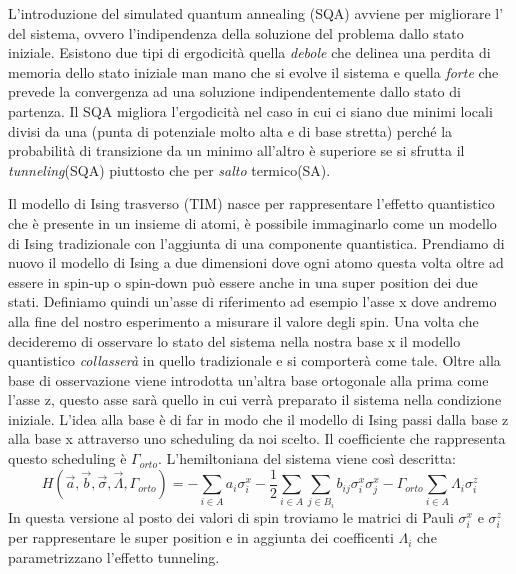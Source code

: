\cite{QA}L'introduzione del simulated quantum annealing (SQA) avviene per migliorare l' del sistema, ovvero l'indipendenza della soluzione del problema dallo stato iniziale. Esistono due tipi di ergodicità quella \textit{debole} che delinea una perdita di memoria dello stato iniziale man mano che si evolve il sistema e quella \textit{forte} che prevede la convergenza ad una soluzione indipendentemente dallo stato di partenza. Il SQA migliora l'ergodicità nel caso in cui ci siano due minimi locali divisi da una  (punta di potenziale molto alta e di base stretta) perché la probabilità di transizione da un minimo all'altro è superiore se si sfrutta il \textit{tunneling}(SQA) piuttosto che per \textit{salto} termico(SA).

\cite{QA}Il modello di Ising trasverso (TIM) nasce per rappresentare l'effetto quantistico che è presente in un insieme di atomi, è possibile immaginarlo come un modello di Ising tradizionale con l'aggiunta di una componente quantistica. Prendiamo di nuovo il modello di Ising a due dimensioni dove ogni atomo questa volta oltre ad essere in spin-up o spin-down può essere anche in una super position dei due stati. Definiamo quindi un'asse di riferimento ad esempio l'asse x dove andremo alla fine del nostro esperimento a misurare il valore degli spin. Una volta che decideremo di osservare lo stato del sistema nella nostra base x il modello quantistico \textit{collasserà} in quello tradizionale e si comporterà come tale. Oltre alla base di osservazione viene introdotta un'altra base ortogonale alla prima come l'asse z, questo asse sarà quello in cui verrà preparato il sistema nella condizione iniziale. L'idea alla base è di far in modo che il modello di Ising passi dalla base z alla base x attraverso uno scheduling da noi scelto. Il coefficiente che rappresenta questo scheduling è $\Gamma_{orto}$. L'hemiltoniana del sistema viene così descritta:
$$ H(\vec{a}, \vec{b}, \vec{\sigma}, \vec{\Lambda}, \Gamma_{orto}) = - \sum_{i \in A } a_i \sigma^x_i - \frac{1}{2} \sum_{i \in A} \sum_{j \in B_i} b_{ij} \sigma^x_i \sigma^x_j - \Gamma_{orto} \sum_{i \in A } \Lambda_i \sigma^z_i$$
In questa versione al posto dei valori di spin troviamo le matrici di Pauli $\sigma^x_i$ e $\sigma^z_i$ per rappresentare le super position e in aggiunta dei coefficenti $\Lambda_i$ che parametrizzano l'effetto tunneling.

